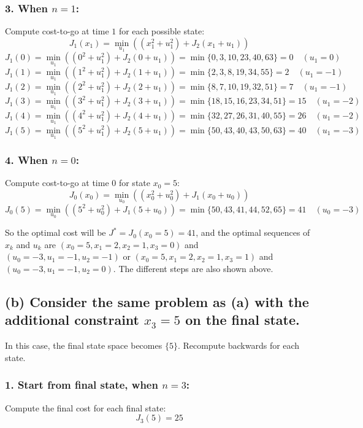 \subsubsection*{3. When \( n = 1 \):}
Compute cost-to-go at time \( 1 \) for each possible state:
\[ J_1(x_1) = \min_{u_1} ((x_1^2 + u_1^2) + J_{2}(x_1 + u_1)) \]
\[ J_1(0) = \min_{u_1} ((0^2 + u_1^2) + J_{2}(0 + u_1)) = \min \{ 0, 3, 10, 23, 40, 63 \} = 0 \quad (u_1 = 0) \]
\[ J_1(1) = \min_{u_1} ((1^2 + u_1^2) + J_{2}(1 + u_1)) = \min \{ 2, 3, 8, 19, 34, 55 \} = 2 \quad (u_1 = -1) \]
\[ J_1(2) = \min_{u_1} ((2^2 + u_1^2) + J_{2}(2 + u_1)) = \min \{ 8, 7, 10, 19, 32, 51 \} = 7 \quad (u_1 = -1) \]
\[ J_1(3) = \min_{u_1} ((3^2 + u_1^2) + J_{2}(3 + u_1)) = \min \{ 18, 15, 16, 23, 34, 51 \} = 15 \quad (u_1 = -2) \]
\[ J_1(4) = \min_{u_1} ((4^2 + u_1^2) + J_{2}(4 + u_1)) = \min \{ 32, 27, 26, 31, 40, 55 \} = 26 \quad (u_1 = -2) \]
\[ J_1(5) = \min_{u_1} ((5^2 + u_1^2) + J_{2}(5 + u_1)) = \min \{ 50, 43, 40, 43, 50, 63 \} = 40 \quad (u_1 = -3) \]

\subsubsection*{4. When \( n = 0 \):}
Compute cost-to-go at time \( 0 \) for state \( x_0 = 5 \):
\[ J_0(x_0) = \min_{u_0} ((x_0^2 + u_0^2) + J_1(x_0 + u_0)) \]
\[ J_0(5) = \min_{u_0} ((5^2 + u_0^2) + J_1(5 + u_0)) = \min \{ 50, 43, 41, 44, 52, 65 \} = 41 \quad (u_0 = -3) \]

So the optimal cost will be \( J^* = J_0(x_0=5) = 41 \), and the optimal sequences of \( x_k \) and \( u_k \) are \( (x_0=5, x_1=2, x_2=1, x_3=0) \) and \( (u_0=-3, u_1=-1, u_2=-1) \) or \( (x_0=5, x_1=2, x_2=1, x_3=1) \) and \( (u_0=-3, u_1=-1, u_2=0) \). The different steps are also shown above.


\subsection*{(b) Consider the same problem as (a) with the additional constraint \( x_3 = 5 \) on the final state.}
In this case, the final state space becomes \( \{ 5 \} \). Recompute backwards for each state.

\subsubsection*{1. Start from final state, when \( n = 3 \):}
Compute the final cost for each final state:
\[ J_3(5) = 25 \]

